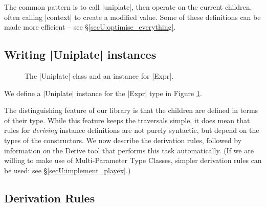 The common pattern is to call |uniplate|, then operate on the current children, often calling |context| to create a modified value. Some of these definitions can be made more efficient -- see \S\ref{secU:optimise_everything}.

\subsection{Writing |Uniplate| instances}
\label{secU:play_instances}

\begin{figure}
\caption{The |Uniplate| class and an instance for |Expr|.}
\label{figU:play_expr}
\end{figure}

We define a |Uniplate| instance for the |Expr| type in Figure \ref{figU:play_expr}.

The distinguishing feature of our library is that the children are defined in terms of their type. While this feature keeps the traversals simple, it does mean that rules for \textit{deriving} instance definitions are not purely syntactic, but depend on the types of the constructors. We now describe the derivation rules, followed by information on the Derive tool that performs this task automatically. (If we are willing to make use of Multi-Parameter Type Classes, simpler derivation rules can be used: see \S\ref{secU:implement_playex}.)


\subsection{Derivation Rules}

